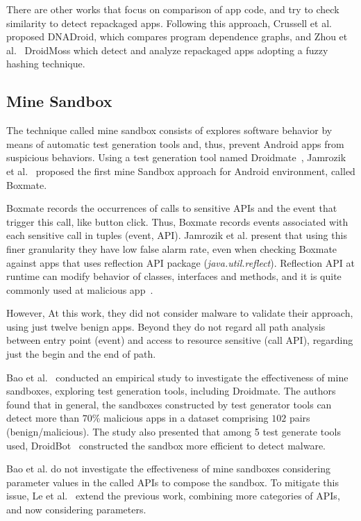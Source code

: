 There are other works that focus on comparison of app code, and try to check similarity to detect repackaged apps. Following this approach, Crussell et al.~\cite{DBLP:conf/esorics/CrussellGC12} proposed  DNADroid, which compares program dependence graphs, and Zhou et al.~\cite{DBLP:conf/codaspy/ZhouZJN12} DroidMoss which detect and analyze repackaged apps adopting a fuzzy hashing technique.

\subsection{Mine Sandbox}\label{sec:mineSandbox}

The technique called mine sandbox consists of explores software behavior by means of automatic test generation tools and, thus, prevent Android apps from suspicious behaviors. Using a test generation tool named Droidmate~\cite{DBLP:conf/icse/JamrozikZ16}, Jamrozik et al.~\cite{DBLP:conf/icse/JamrozikSZ16} proposed the first mine Sandbox approach for Android environment, called Boxmate. 

Boxmate records the occurrences of calls to sensitive APIs and the event that trigger this call, like button click. Thus, Boxmate records events associated with each sensitive call in tuples (event, API). Jamrozik et al. present that using this finer granularity they have low false alarm rate, even when checking Boxmate against apps that uses reflection API package (\textit{java.util.reflect}). Reflection API at runtime can modify behavior of classes, interfaces and methods, and it is quite commonly used at malicious app~\cite{DBLP:conf/issta/0029BOK16}. 

However, At this work, they did not consider malware to validate their approach, using just twelve benign apps. Beyond they do not regard all path analysis between entry point (event) and access to resource sensitive (call API), regarding just the begin and the end of path.

Bao et al.~\cite{DBLP:conf/wcre/BaoLL18} conducted an empirical study to investigate the effectiveness of mine sandboxes, exploring test generation tools, including Droidmate. The authors found that in general, the sandboxes constructed by test generator tools can detect more than $70$\% malicious apps in a dataset comprising $102$ pairs (benign/malicious). The study also presented that among 5 test generate tools used, DroidBot~\cite{DBLP:conf/icse/LiYGC17} constructed the sandbox more efficient to detect malware.

Bao et al. do not investigate the effectiveness of mine sandboxes considering parameter values in the called APIs to compose the sandbox. To mitigate this issue, Le et al.~\cite{le2018towards} extend the previous work, combining more categories of APIs, and now considering parameters.

